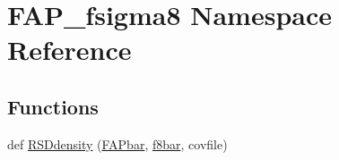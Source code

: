 \hypertarget{namespaceFAP__fsigma8}{}\section{F\+A\+P\+\_\+fsigma8 Namespace Reference}
\label{namespaceFAP__fsigma8}
\subsection*{Functions}
\begin{DoxyCompactItemize}
\item 
def \mbox{\hyperlink{namespaceFAP__fsigma8_a80cad49915e715358d6cf2af830fb271}{R\+S\+Ddensity}} (\mbox{\hyperlink{namespaceFAP__fsigma8_a21f75188f94e2d15b133164b044318dd}{F\+A\+Pbar}}, \mbox{\hyperlink{namespaceFAP__fsigma8_aa11ac818be82b0a372ec359695ca6fd8}{f8bar}}, covfile)
\end{DoxyCompactItemize}
